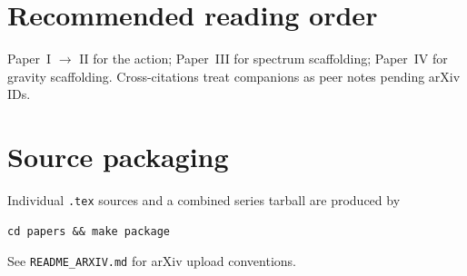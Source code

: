 \documentclass[11pt]{article}
\begin{document}
\section{Recommended reading order}

Paper~I $\to$ II for the action; Paper~III for spectrum scaffolding; Paper~IV for
gravity scaffolding. Cross-citations treat companions as peer notes pending arXiv IDs.

\section{Source packaging}

Individual \texttt{.tex} sources and a combined series tarball are produced by
\begin{verbatim}
cd papers && make package
\end{verbatim}
See \texttt{README\_ARXIV.md} for arXiv upload conventions.
\end{document}
